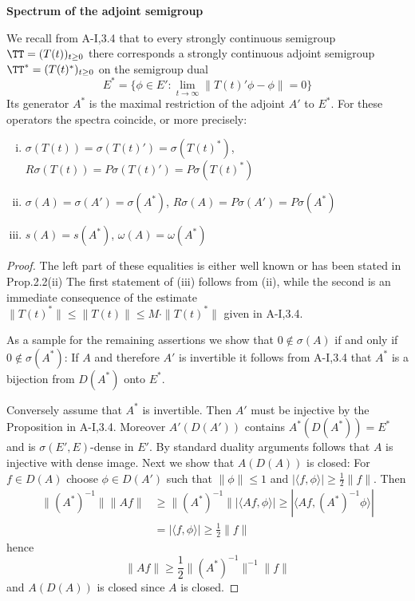 \begin{example}{\textbf{Spectrum of the adjoint semigroup}}
\label{ex:a3-4.4}	

We recall from A-I,3.4 that to every strongly continuous semigroup $\TT = (T(t))_{t \geq 0}$ there corresponds a strongly continuous adjoint semigroup $\TT^* = (T(t)^*)_{t \geq 0}$ on the semigroup dual
\[
E^* = \{\phi \in E' \colon \lim_{t \to \infty} \|T(t)'\phi-\phi\| = 0\}
\]
Its generator $A^*$ is the maximal restriction of the adjoint $A'$ to $E^*$.
For these operators the spectra coincide, or more precisely:
\begin{enumerate}[(i)]
\item 
$\sigma(T(t)) = \sigma(T(t)') = \sigma(T(t)^*)$,\\
$R\sigma(T(t)) = P\sigma(T(t)') = P\sigma(T(t)^*)$

\item 
$\sigma(A) = \sigma(A') = \sigma(A^*)$, $R\sigma(A) = P\sigma(A') = P\sigma(A^*)$
\item 
$s(A) = s(A^*)$, $\omega(A) = \omega(A^*)$
\end{enumerate}

\begin{proof}
The left part of these equalities is either well known or has been stated in Prop.2.2(ii)
The first statement of (iii) follows from (ii), while the second is an immediate consequence of the estimate $\|T(t)^*\| \leq \|T(t)\| \leq M\cdot\|T(t)^*\|$ given in A-I,3.4.

As a sample for the remaining assertions we show that $0 \notin \sigma(A)$ if and only if $0 \notin \sigma(A^*)$:
If $A$ and therefore $A'$ is invertible it follows from A-I,3.4 that $A^*$ is a bijection from $D(A^*)$ onto $E^*$.

Conversely assume that $A^*$ is invertible.
Then $A'$ must be injective by the Proposition in A-I,3.4.
Moreover $A'(D(A'))$ contains $A^*(D(A^*)) = E^*$ and is $\sigma(E',E)$-dense in $E'$.
By standard duality arguments follows that $A$ is injective with dense image.
Next we show that $A(D(A))$ is closed: For $f \in D(A)$ choose $\phi \in D(A')$ such that $\|\phi\| \leq 1$ and $|\langle f,\phi \rangle| \geq \frac{1}{2}\|f\|$.
Then
\begin{align*}
\|(A^*)^{-1}\| \|Af\| &\geq \|(A^*)^{-1}\| |\langle Af,\phi \rangle| \geq |\langle Af,(A^*)^{-1}\phi \rangle| \\
&= |\langle f,\phi \rangle| \geq \frac{1}{2}\|f\|
\end{align*}
hence
\[
\|Af\| \geq \frac{1}{2}\|(A^*)^{-1}\|^{-1}\|f\|
\]
and $A(D(A))$ is closed since $A$ is closed.
\end{proof}
\end{example}

